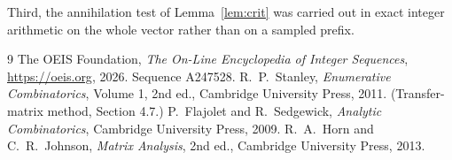 \documentclass[11pt,a4paper]{article}
\theoremstyle{plain}
\theoremstyle{definition}
\begin{document}
Third, the annihilation test of Lemma~\ref{lem:crit} was carried out in exact integer
arithmetic on the whole vector rather than on a sampled prefix.

\begin{thebibliography}{9}
 The OEIS Foundation, \emph{The On-Line Encyclopedia of Integer
Sequences}, \url{https://oeis.org}, 2026. Sequence A247528.
 R.~P.~Stanley, \emph{Enumerative Combinatorics}, Volume 1, 2nd ed.,
Cambridge University Press, 2011. (Transfer-matrix method, Section 4.7.)
 P.~Flajolet and R.~Sedgewick, \emph{Analytic Combinatorics}, Cambridge
University Press, 2009.
 R.~A.~Horn and C.~R.~Johnson, \emph{Matrix Analysis}, 2nd ed., Cambridge
University Press, 2013.
\end{thebibliography}
\end{document}

